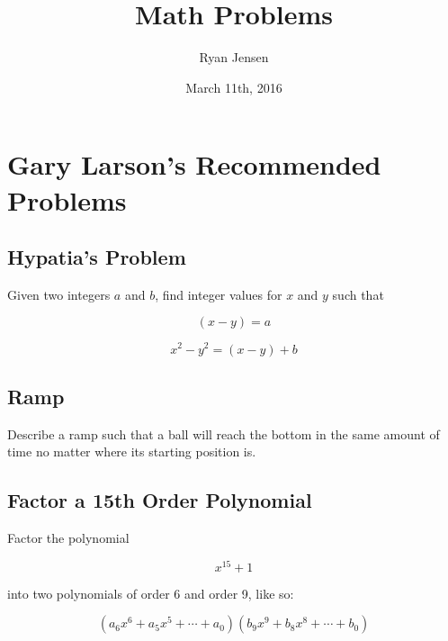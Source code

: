 \documentclass[letterpaper, margin=2in, 11pt]{report}
\begin{document}
	
	
	\author{Ryan Jensen}
	\title{Math Problems}
	\date{March 11th, 2016}
	\maketitle
	
	
	
	\tableofcontents
	
	
	
	\chapter{Gary Larson's Recommended Problems}
	
		\section{Hypatia's Problem}
			
			Given two integers \(a\) and \(b\), find integer values for \(x\) and \(y\) such that
			
			\begin{equation}
				(x-y) = a
			\end{equation}
			
			\begin{equation}
				x^2 - y^2 = (x-y) + b
			\end{equation}
			
			
		\section{Ramp}
			
			Describe a ramp such that a ball will reach the bottom in the same amount of time no matter where its starting position is.
			
			
		\section{Factor a 15th Order Polynomial}
			
			Factor the polynomial
			
			\begin{equation}
				x^{15} + 1
			\end{equation}
			
			into two polynomials of order 6 and order 9, like so:
			
			\begin{equation}
				(a_6x^6 + a_5x^5 + \cdots + a_0)(b_9x^9 + b_8x^8 + \cdots + b_0)
			\end{equation}
			
		
	
\end{document}

